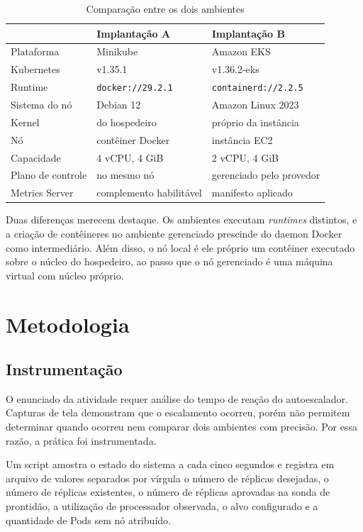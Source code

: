 \documentclass[12pt]{article}
\begin{document}
\begin{table}[ht]
\centering
\caption{Comparação entre os dois ambientes}
\label{tab:ambientes}
\small
\begin{tabular}{@{}lll@{}}
\toprule
 & \textbf{Implantação A} & \textbf{Implantação B} \\
\midrule
Plataforma        & Minikube                & Amazon EKS \\
Kubernetes        & v1.35.1                 & v1.36.2-eks \\
Runtime           & \texttt{docker://29.2.1} & \texttt{containerd://2.2.5} \\
Sistema do nó     & Debian 12               & Amazon Linux 2023 \\
Kernel            & do hospedeiro           & próprio da instância \\
Nó                & contêiner Docker        & instância EC2 \\
Capacidade        & 4 vCPU, 4 GiB           & 2 vCPU, 4 GiB \\
Plano de controle & no mesmo nó             & gerenciado pelo provedor \\
Metrics Server    & complemento habilitável & manifesto aplicado \\
\bottomrule
\end{tabular}
\end{table}

Duas diferenças merecem destaque. Os
ambientes executam \emph{runtimes} distintos, e a criação de contêineres no
ambiente gerenciado prescinde do daemon Docker como intermediário. Além disso,
o nó local é ele próprio um contêiner executado sobre o núcleo do hospedeiro,
ao passo que o nó gerenciado é uma máquina virtual com núcleo próprio.

\section{Metodologia}

\subsection{Instrumentação}

O enunciado da atividade requer análise do tempo de reação do autoescalador.
Capturas de tela demonstram que o escalamento ocorreu, porém não permitem
determinar quando ocorreu nem comparar dois ambientes com precisão. Por essa
razão, a prática foi instrumentada.

Um script amostra o estado do sistema a cada cinco segundos e registra em
arquivo de valores separados por vírgula o número de réplicas desejadas, o
número de réplicas existentes, o número de réplicas aprovadas na sonda de
prontidão, a utilização de processador observada, o alvo configurado e a
quantidade de Pods sem nó atribuído.
\end{document}
